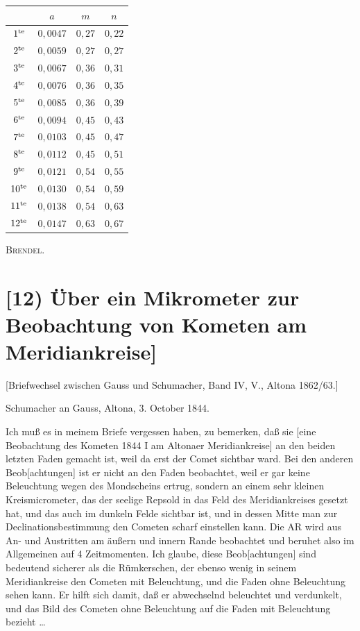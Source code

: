 \documentclass[12pt,a4paper]{article}
\theoremstyle{plain}
\theoremstyle{definition}
\theoremstyle{remark}
\begin{document}
\begin{center}
\begin{tabular}{c|c|c|c}
& $a$ & $m$ & $n$ \\
\hline
$1^{\rm te}$ & $0{,}0047$ & $0{,}27$ & $0{,}22$ \\
$2^{\rm te}$ & $0{,}0059$ & $0{,}27$ & $0{,}27$ \\
$3^{\rm te}$ & $0{,}0067$ & $0{,}36$ & $0{,}31$ \\
$4^{\rm te}$ & $0{,}0076$ & $0{,}36$ & $0{,}35$ \\
$5^{\rm te}$ & $0{,}0085$ & $0{,}36$ & $0{,}39$ \\
$6^{\rm te}$ & $0{,}0094$ & $0{,}45$ & $0{,}43$ \\
$7^{\rm te}$ & $0{,}0103$ & $0{,}45$ & $0{,}47$ \\
$8^{\rm te}$ & $0{,}0112$ & $0{,}45$ & $0{,}51$ \\
$9^{\rm te}$ & $0{,}0121$ & $0{,}54$ & $0{,}55$ \\
$10^{\rm te}$ & $0{,}0130$ & $0{,}54$ & $0{,}59$ \\
$11^{\rm te}$ & $0{,}0138$ & $0{,}54$ & $0{,}63$ \\
$12^{\rm te}$ & $0{,}0147$ & $0{,}63$ & $0{,}67$
\end{tabular}
\end{center}

\hfill\textsc{Brendel}.

\newpage

\section*{[12) \"Uber ein Mikrometer zur Beobachtung von Kometen am Meridiankreise]}

[Briefwechsel zwischen Gauss und Schumacher, Band IV, V., Altona 1862/63.]

Schumacher an Gauss, Altona, 3. October 1844.

\glqq Ich mu\ss{} es in meinem Briefe vergessen haben, zu bemerken, da\ss{} sie [eine Beobachtung des Kometen 1844 I am Altonaer Meridiankreise] an den beiden letzten Faden gemacht ist, weil da erst der Comet sichtbar ward. Bei den anderen Beob[achtungen] ist er nicht an den Faden beobachtet, weil er gar keine Beleuchtung wegen des Mondscheins ertrug, sondern an einem sehr kleinen Kreismicrometer, das der seelige Repsold in das Feld des Meridiankreises gesetzt hat, und das auch im dunkeln Felde sichtbar ist, und in dessen Mitte man zur Declinationsbestimmung den Cometen scharf einstellen kann. Die AR wird aus An- und Austritten am \"au\ss ern und innern Rande beobachtet und beruhet also im Allgemeinen auf 4 Zeitmomenten. Ich glaube, diese Beob[achtungen] sind bedeutend sicherer als die R\"umkerschen, der ebenso wenig in seinem Meridiankreise den Cometen mit Beleuchtung, und die Faden ohne Beleuchtung sehen kann. Er hilft sich damit, da\ss{} er abwechselnd beleuchtet und verdunkelt, und das Bild des Cometen ohne Beleuchtung auf die Faden mit Beleuchtung bezieht \ldots\ \grqq
\end{document}
